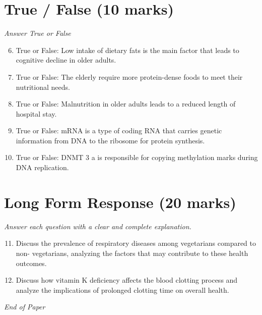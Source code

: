 \documentclass[12pt]{article}
\begin{document}
\section*{True / False (10 marks)}
\textit{Answer True or False}
\begin{enumerate}[label=\arabic*.]
\setcounter{enumi}{5}
\item True or False: Low intake of dietary fats is the main factor that leads to cognitive decline in older adults.
\item True or False: The elderly require more protein-dense foods to meet their nutritional needs.
\item True or False: Malnutrition in older adults leads to a reduced length of hospital stay.
\item True or False: mRNA is a type of coding RNA that carries genetic information from DNA to the ribosome for protein synthesis.
\item True or False: DNMT 3 a is responsible for copying methylation marks during DNA replication.
\end{enumerate}

\section*{Long Form Response (20 marks)}
\textit{Answer each question with a clear and complete explanation.}
\begin{enumerate}[label=\arabic*.]
\setcounter{enumi}{10}
\item Discuss the prevalence of respiratory diseases among vegetarians compared to non- vegetarians, analyzing the factors that may contribute to these health outcomes.
\item Discuss how vitamin K deficiency affects the blood clotting process and analyze the implications of prolonged clotting time on overall health.
\end{enumerate}

\vfill
\noindent\textit{End of Paper}
\end{document}
